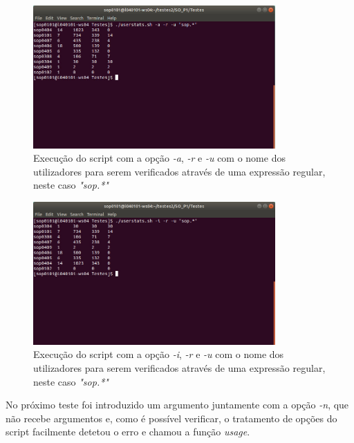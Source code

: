 \documentclass[10pt,portuguese]{article}
\begin{document}
\begin{figure}[!h]
    \centering
    \includegraphics[width=350]{Resultados/user_a_r_u.jpeg}
    \caption{Execução do script com a opção \textit{-a}, \textit{-r} e \textit{-u} com o nome dos utilizadores para serem verificados através de uma expressão regular, neste caso \textit{"sop.*"}}
\end{figure}

\begin{figure}[!h]
    \centering
    \includegraphics[width=350]{Resultados/user_i_r_u.jpeg}
    \caption{Execução do script com a opção \textit{-i}, \textit{-r} e \textit{-u} com o nome dos utilizadores para serem verificados através de uma expressão regular, neste caso \textit{"sop.*"}}
\end{figure}
\clearpage

No próximo teste foi introduzido um argumento juntamente com a opção \textit{-n}, que não recebe argumentos e, como é possível verificar, o tratamento de opções do script facilmente detetou o erro e chamou a função \textit{usage}.
\end{document}
